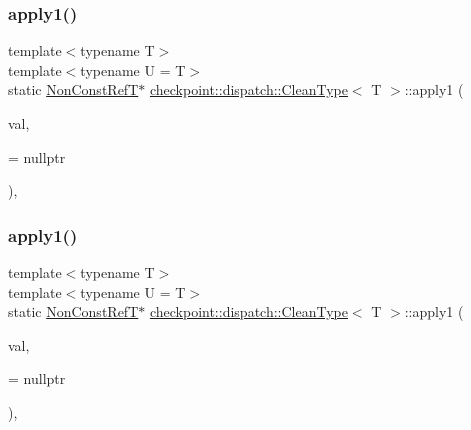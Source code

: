 \subsubsection{\texorpdfstring{apply1()}{apply1()}\hspace{0.1cm}{\footnotesize\ttfamily [1/2]}}
{\footnotesize\ttfamily template$<$typename T$>$ \\
template$<$typename U  = T$>$ \\
static \hyperlink{structcheckpoint_1_1dispatch_1_1_clean_type_a22ac8ae19000187cd7d3d218f3efa46e}{Non\+Const\+RefT}$\ast$ \hyperlink{structcheckpoint_1_1dispatch_1_1_clean_type}{checkpoint\+::dispatch\+::\+Clean\+Type}$<$ T $>$\+::apply1 (\begin{DoxyParamCaption}\item[{T $\ast$}]{val,  }\item[{\hyperlink{structcheckpoint_1_1dispatch_1_1_clean_type_a8edf98e1e2cbcd55b0b0a57d563be9e7}{is\+Const}$<$ U $>$ $\ast$}]{ = {\ttfamily nullptr} }\end{DoxyParamCaption})\hspace{0.3cm}{\ttfamily [inline]}, {\ttfamily [static]}}

\mbox{\label{structcheckpoint_1_1dispatch_1_1_clean_type_ac29a0f7671b127852a6244c0e9f1919a}} 
\subsubsection{\texorpdfstring{apply1()}{apply1()}\hspace{0.1cm}{\footnotesize\ttfamily [2/2]}}
{\footnotesize\ttfamily template$<$typename T$>$ \\
template$<$typename U  = T$>$ \\
static \hyperlink{structcheckpoint_1_1dispatch_1_1_clean_type_a22ac8ae19000187cd7d3d218f3efa46e}{Non\+Const\+RefT}$\ast$ \hyperlink{structcheckpoint_1_1dispatch_1_1_clean_type}{checkpoint\+::dispatch\+::\+Clean\+Type}$<$ T $>$\+::apply1 (\begin{DoxyParamCaption}\item[{T $\ast$}]{val,  }\item[{\hyperlink{structcheckpoint_1_1dispatch_1_1_clean_type_a87436675be4aca146c0ff68911684634}{is\+Not\+Const}$<$ U $>$ $\ast$}]{ = {\ttfamily nullptr} }\end{DoxyParamCaption})\hspace{0.3cm}{\ttfamily [inline]}, {\ttfamily [static]}}

